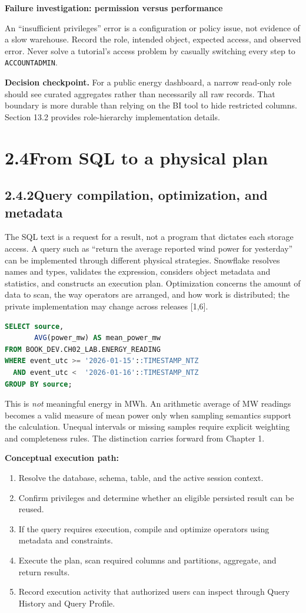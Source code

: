 \documentclass[11pt,twoside]{article}
\newcommand{\topic}[2]{\subsection*{#1\quad #2}}
\begin{document}
\begin{whitebox}
\textbf{Failure investigation: permission versus performance}\par
An ``insufficient privileges'' error is a configuration or policy issue, not evidence of a slow warehouse. Record the role, intended object, expected access, and observed error. Never solve a tutorial's access problem by casually switching every step to \texttt{ACCOUNTADMIN}.
\end{whitebox}
\textbf{Decision checkpoint.} For a public energy dashboard, a narrow read-only role should see curated aggregates rather than necessarily all raw records. That boundary is more durable than relying on the BI tool to hide restricted columns. Section 13.2 provides role-hierarchy implementation details.

\newpage
\section*{2.4\quad From SQL to a physical plan}
\topic{2.4.2}{Query compilation, optimization, and metadata}
The SQL text is a request for a result, not a program that dictates each storage access. A query such as ``return the average reported wind power for yesterday'' can be implemented through different physical strategies. Snowflake resolves names and types, validates the expression, considers object metadata and statistics, and constructs an execution plan. Optimization concerns the amount of data to scan, the way operators are arranged, and how work is distributed; the private implementation may change across releases [1,6].

\begin{lstlisting}[language=SQL,caption={A deliberately small, semantically explicit analytical query.}]
SELECT source,
       AVG(power_mw) AS mean_power_mw
FROM BOOK_DEV.CH02_LAB.ENERGY_READING
WHERE event_utc >= '2026-01-15'::TIMESTAMP_NTZ
  AND event_utc <  '2026-01-16'::TIMESTAMP_NTZ
GROUP BY source;
\end{lstlisting}
This is \emph{not} meaningful energy in MWh. An arithmetic average of MW readings becomes a valid measure of mean power only when sampling semantics support the calculation. Unequal intervals or missing samples require explicit weighting and completeness rules. The distinction carries forward from Chapter 1.

\textbf{Conceptual execution path:}
\begin{enumerate}
\item Resolve the database, schema, table, and the active session context.
\item Confirm privileges and determine whether an eligible persisted result can be reused.
\item If the query requires execution, compile and optimize operators using metadata and constraints.
\item Execute the plan, scan required columns and partitions, aggregate, and return results.
\item Record execution activity that authorized users can inspect through Query History and Query Profile.
\end{enumerate}
\end{document}

